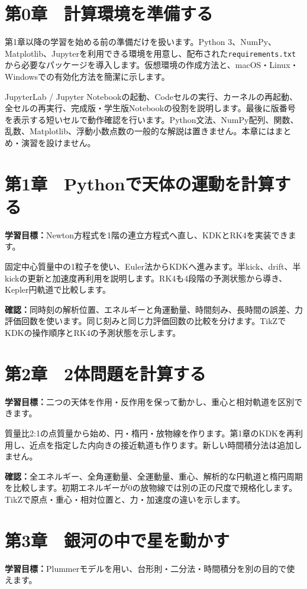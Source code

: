 \documentclass[10pt,openany]{book}
\begin{document}
\clearpage
\section{第0章　計算環境を準備する}
第1章以降の学習を始める前の準備だけを扱います。Python 3、NumPy、Matplotlib、Jupyterを利用できる環境を用意し、配布された\texttt{requirements.txt}から必要なパッケージを導入します。仮想環境の作成方法と、macOS・Linux・Windowsでの有効化方法を簡潔に示します。

JupyterLab / Jupyter Notebookの起動、Codeセルの実行、カーネルの再起動、全セルの再実行、完成版・学生版Notebookの役割を説明します。最後に版番号を表示する短いセルで動作確認を行います。Python文法、NumPy配列、関数、乱数、Matplotlib、浮動小数点数の一般的な解説は置きません。本章にはまとめ・演習を設けません。

\section{第1章　Pythonで天体の運動を計算する}
\textbf{学習目標：}Newton方程式を1階の連立方程式へ直し、KDKとRK4を実装できます。

固定中心質量中の1粒子を使い、Euler法からKDKへ進みます。半kick、drift、半kickの更新と加速度再利用を説明します。RK4も4段階の予測状態から導き、Kepler円軌道で比較します。

\textbf{確認：}同時刻の解析位置、エネルギーと角運動量、時間刻み、長時間の誤差、力評価回数を使います。同じ刻みと同じ力評価回数の比較を分けます。TikZでKDKの操作順序とRK4の予測状態を示します。

\section{第2章　2体問題を計算する}
\textbf{学習目標：}二つの天体を作用・反作用を保って動かし、重心と相対軌道を区別できます。

質量比2:1の点質量から始め、円・楕円・放物線を作ります。第1章のKDKを再利用し、近点を指定した内向きの接近軌道も作ります。新しい時間積分法は追加しません。

\textbf{確認：}全エネルギー、全角運動量、全運動量、重心、解析的な円軌道と楕円周期を比較します。初期エネルギーが0の放物線では別の正の尺度で規格化します。TikZで原点・重心・相対位置と、力・加速度の違いを示します。

\clearpage
\section{第3章　銀河の中で星を動かす}
\textbf{学習目標：}Plummerモデルを用い、台形則・二分法・時間積分を別の目的で使えます。
\end{document}
